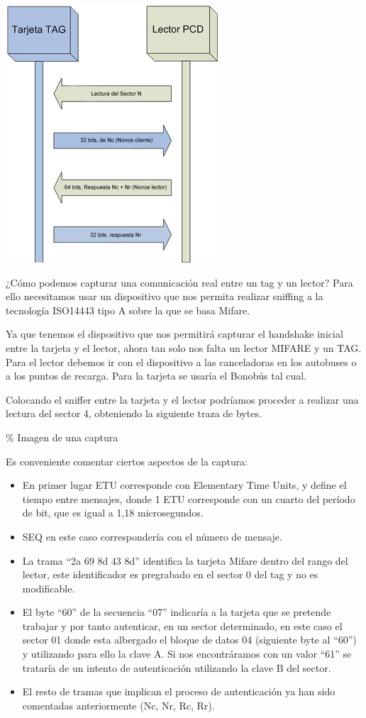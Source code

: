 \includegraphics{memoria/images/fig4-4.jpg}

¿Cómo podemos capturar una comunicación real entre un tag y un lector?
Para ello necesitamos usar un dispositivo que nos permita realizar
sniffing a la tecnología ISO14443 tipo A sobre la que se basa Mifare.

Ya que tenemos el dispositivo que nos permitirá capturar el handshake
inicial entre la tarjeta y el lector, ahora tan solo nos falta un lector
MIFARE y un TAG. Para el lector debemos ir con el dispositivo a las
canceladoras en los autobuses o a los puntos de recarga. Para la tarjeta
se usaría el Bonobús tal cual.

Colocando el sniffer entre la tarjeta y el lector podríamos proceder a
realizar una lectura del sector 4, obteniendo la siguiente traza de
bytes.

\% Imagen de una captura

Es conveniente comentar ciertos aspectos de la captura:

\begin{itemize}
\itemsep1pt\parskip0pt
\item
  En primer lugar ETU corresponde con Elementary Time Units, y define el
  tiempo entre mensajes, donde 1 ETU corresponde con un cuarto del
  período de bit, que es igual a 1,18 microsegundos.
\item
  SEQ en este caso correspondería con el número de mensaje.
\item
  La trama ``2a 69 8d 43 8d'' identifica la tarjeta Mifare dentro del
  rango del lector, este identificador es pregrabado en el sector 0 del
  tag y no es modificable.
\item
  El byte ``60'' de la secuencia ``07'' indicaría a la tarjeta que se
  pretende trabajar y por tanto autenticar, en un sector determinado, en
  este caso el sector 01 donde esta albergado el bloque de datos 04
  (siguiente byte al ``60'') y utilizando para ello la clave A. Si nos
  encontráramos con un valor ``61'' se trataría de un intento de
  autenticación utilizando la clave B del sector.
\item
  El resto de tramas que implican el proceso de autenticación ya han
  sido comentadas anteriormente (Nc, Nr, Rc, Rr).
\end{itemize}


